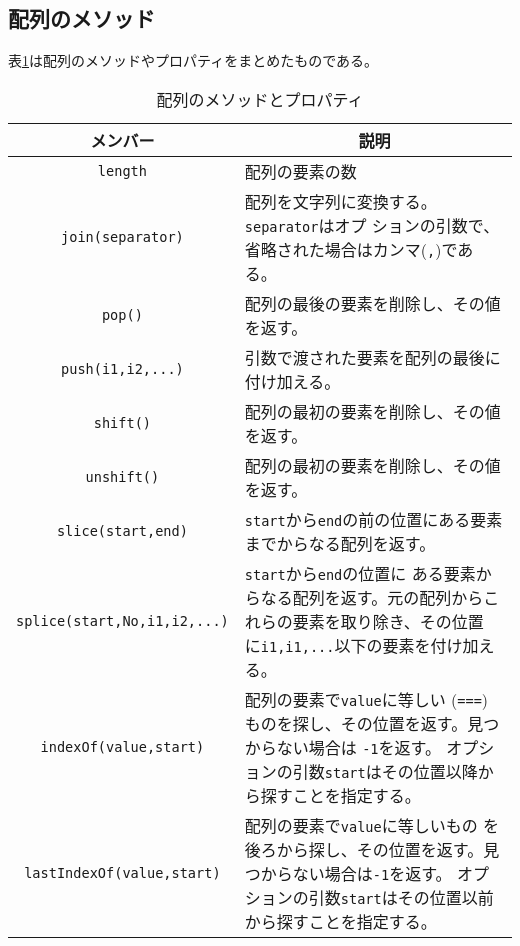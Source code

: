 \subsection{配列のメソッド}
表\ref{arrayPropMethod}は配列のメソッドやプロパティをまとめたものである。
\begin{table}[ht]
\caption{配列のメソッドとプロパティ}\label{arrayPropMethod}
 \begin{tabular}{|c|m{}|}\hline
 メンバー&\multicolumn{1}{c|}{説明} \\\hline
  \Verb+length+ &配列の要素の数\\ \hline
  \Verb+join(separator)+& 配列を文字列に変換する。\Verb+separator+はオプ
      ションの引数で、省略された場合はカンマ(\Verb+,+)である。\\ \hline
  \Verb+pop()+& 配列の最後の要素を削除し、その値を返す。
      \\ \hline
  \Verb+push(i1,i2,...)+& 引数で渡された要素を配列の最後に付け加える。
      \\ \hline
  \Verb+shift()+&配列の最初の要素を削除し、その値を返す。
      \\ \hline
  \Verb+unshift()+&配列の最初の要素を削除し、その値を返す。
      \\ \hline
  \Verb+slice(start,end)+&\Verb+start+から\Verb+end+の前の位置にある要素
      までからなる配列を返す。%
      \\ \hline
  \Verb+splice(start,No,i1,i2,...)+&
      \Verb+start+から\Verb+end+の位置に
      ある要素からなる配列を返す。元の配列からこれらの要素を取り除き、その位置
      に\Verb+i1,i1,...+以下の要素を付け加える。%
      \\ \hline
  \Verb+indexOf(value,start)+&配列の要素で\texttt{value}に等しい
      (\texttt{===})ものを探し、その位置を返す。見つからない場合は
      \texttt{-1}を返す。
      オプションの引数\texttt{start}はその位置以降から探すことを指定する。
      \\ \hline
  \Verb+lastIndexOf(value,start)+&配列の要素で\texttt{value}に等しいもの
      を後ろから探し、その位置を返す。見つからない場合は\texttt{-1}を返す。
      オプションの引数\texttt{start}はその位置以前から探すことを指定する。
      \\ \hline
\end{tabular}
\end{table}

